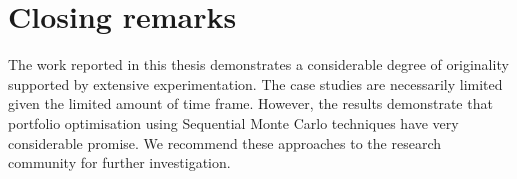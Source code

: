 \section{Closing remarks}
\label{ClosingRemark}
The work reported in this thesis demonstrates a considerable degree of
originality supported by extensive experimentation. The case studies
are necessarily limited given the limited amount of time frame.  However, the results
 demonstrate that portfolio optimisation using Sequential Monte Carlo techniques have very considerable promise. We recommend these approaches to
the research community for further investigation.





